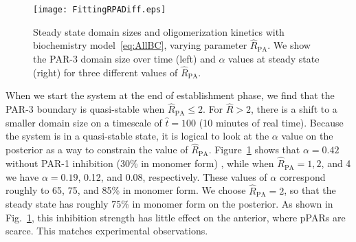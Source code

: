 \documentclass[11pt]{article}
\newcommand{\red}[1]{\color{red}#1\normalcolor}
\newcommand{\6}[1]{#1_{\text{6}}}
\newcommand{\3}[1]{#1_{\text{3}}}
\begin{document}
\begin{figure}
\centering
\texttt{[image: FittingRPADiff.eps]}
\caption{\label{fig:BCSS}Steady state domain sizes and oligomerization kinetics with biochemistry model\ \eqref{eq:AllBC}, varying parameter $\hat R_\text{PA}$. We show the PAR-3 domain size over time (left) and $\alpha$ values at steady state (right) for three different values of $\hat R_\text{PA}$. }
\end{figure}

When we start the system at the end of establishment phase, we find that the PAR-3 boundary is quasi-stable when $\hat R_\text{PA} \leq 2$. For $\hat R > 2$, there is a shift to a smaller domain size on a timescale of $\hat t = 100$ (10 minutes of real time). Because the system is in a quasi-stable state, it is logical to look at the $\alpha$ value on the posterior as a way to constrain the value of $\hat R_\text{PA}$. Figure\ \ref{fig:BCSS} shows that $\alpha=0.42$ without PAR-1 inhibition (30\% in monomer form) \cite{lang2023oligomerization}, while when $\hat R_\text{PA}=1,2$, and 4 we have $\alpha=0.19$, 0.12, and 0.08, respectively. These values of $\alpha$ correspond roughly to 65, 75, and 85\% in monomer form. \red{We choose $\hat R_\text{PA}=2$, so that the steady state has roughly 75\% in monomer form on the posterior. As shown in Fig.\ \ref{fig:BCSS}, this inhibition strength has little effect on the anterior, where pPARs are scarce. This matches experimental observations.}
\fi
\end{document}
